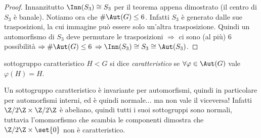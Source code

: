 \begin{proof}
    Innanzitutto $\Inn(S_3) \cong S_3$ per il teorema appena dimostrato (il centro di $S_3$ è banale). Notiamo ora che $\#\Aut(G) \leq 6$. Infatti $S_3$ è generato dalle sue trasposizioni, la cui immagine può essere solo un'altra trasposizione. Quindi un automorfismo di $S_3$ deve permutare le trasposizioni $\Rightarrow$ ci sono (al più) 6 possibilità $\Rightarrow \#\Aut(G) \leq 6$ $\Rightarrow \Inn(S_3) \cong S_3 \cong \Aut(S_3)$.
\end{proof}
\begin{definition}{sottogruppo caratteristico}
    $H < G$ si dice \textit{caratteristico} se $\forall \varphi \in \Aut(G)$ vale $\varphi(H)=H$.
\end{definition}

Un sottogruppo caratteristico è invariante per automorfismi, quindi in particolare per automorfismi interni, ed è quindi normale... ma non vale il viceversa! Infatti $\Z/2\Z \times \Z/2\Z$ è abeliano, quindi tutti i suoi sottogruppi sono normali, tuttavia l'omomorfismo che scambia le componenti dimostra che $\Z/2\Z \times \set{0}$ non è caratteristico.

